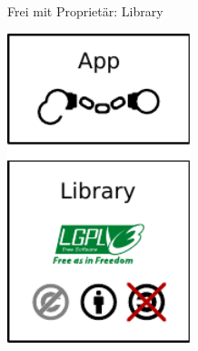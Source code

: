 \begin{frame}{Frei mit Proprietär: Library}
\begin{multicols}{2}
\begin{center}
{				\includegraphics[width=0.4\textwidth]{res/propritary-dynamic-linking-lgpl.pdf}
			}
		\end{center}
		\pagebreak
		\begin{center}
		\end{center}
	\end{multicols}
\end{frame}
